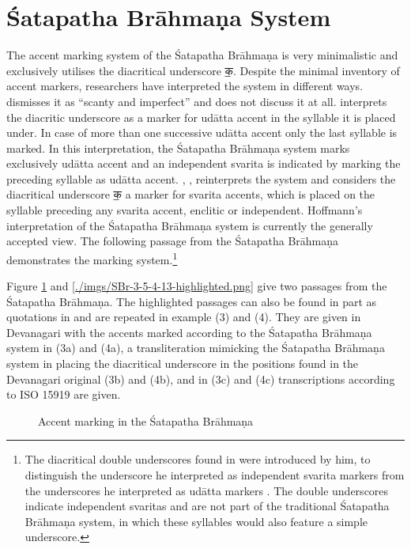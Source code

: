 \section{Śatapatha Brāhmaṇa System}

The accent marking system of the Śatapatha Brāhmaṇa is very minimalistic and exclusively utilises the diacritical underscore {\devfont क॒}. Despite the minimal inventory of accent markers, researchers have interpreted the system in different ways. \citet[p.~88]{Whitney1889} dismisses it as “scanty and imperfect” and does not discuss it at all. \citet[p.~451]{Macdonell1916} interprets the diacritic underscore as a marker for udātta accent in the syllable it is placed under. In case of more than one successive udātta accent only the last syllable is marked. In this interpretation, the Śatapatha Brāhmaṇa system marks exclusively udātta accent and an independent svarita is indicated by marking the preceding syllable as udātta accent. \citet{Hoffmann1956},  \citep[English translation in][p.~475, n17]{Witzel1974}, reinterprets the system and considers the diacritical underscore {\devfont क॒} a marker for svarita accents, which is placed on the syllable preceding any svarita accent, enclitic or independent. Hoffmann’s interpretation of the Śatapatha Brāhmaṇa system is currently the generally accepted view. The following passage from the Śatapatha Brāhmaṇa \citep{Weber1849} demonstrates the marking system.\footnote{The diacritical double underscores found in \citet{Weber1849} were introduced by him, to distinguish the underscore he interpreted as independent svarita markers from the underscores he interpreted as udātta markers \citep[][p.~xii-xiii]{Weber1849}. The double underscores indicate independent svaritas and are not part of the traditional Śatapatha Brāhmaṇa system, in which these syllables would also feature a simple underscore.} 

Figure \ref{fig:SBr-1-1-2-9} and \ref{./imgs/SBr-3-5-4-13-highlighted.png} give two passages from the Śatapatha Brāhmaṇa. The highlighted passages can also be found in part as quotations in \citet{pwg} and are repeated in example (3) and (4). They are given in Devanagari with the accents marked according to the Śatapatha Brāhmaṇa system in (3a) and (4a), a transliteration mimicking the Śatapatha Brāhmaṇa system in placing the diacritical underscore in the positions found in the Devanagari original (3b) and (4b), and in (3c) and (4c) transcriptions according to ISO 15919 are given.

\begin{figure}[!ht]
\begin{center}
\end{center}
\caption[Accent marking in the Śatapatha Brāhmaṇa]{\label{fig:SBr-1-1-2-9}Accent marking in the Śatapatha Brāhmaṇa}
\end{figure}

